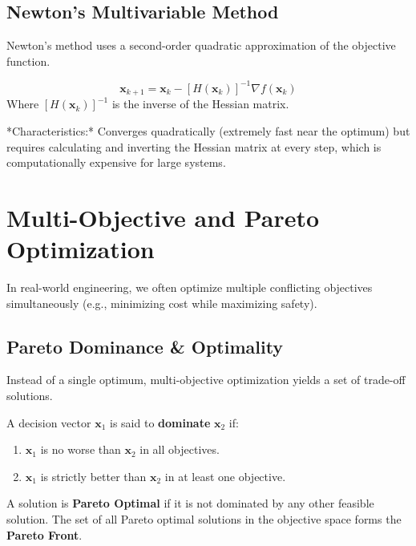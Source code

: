 \documentclass[12pt,a4paper]{article}
\begin{document}
\subsection{Newton's Multivariable Method}
Newton's method uses a second-order quadratic approximation of the objective function.

\begin{tcolorbox}[formulabox, title={Newton's Multivariable Update}]
\begin{equation}
  \mathbf{x}_{k+1} = \mathbf{x}_k - [H(\mathbf{x}_k)]^{-1} \nabla f(\mathbf{x}_k)
\end{equation}
Where $[H(\mathbf{x}_k)]^{-1}$ is the inverse of the Hessian matrix.
\par\vspace{3pt}
*Characteristics:* Converges quadratically (extremely fast near the optimum) but requires calculating and inverting the Hessian matrix at every step, which is computationally expensive for large systems.
\end{tcolorbox}

\section{Multi-Objective and Pareto Optimization}

In real-world engineering, we often optimize multiple conflicting objectives simultaneously (e.g., minimizing cost while maximizing safety).

\subsection{Pareto Dominance \& Optimality}
Instead of a single optimum, multi-objective optimization yields a set of trade-off solutions.

\begin{tcolorbox}[defbox, title={Definition of Pareto Dominance}]
A decision vector $\mathbf{x}_1$ is said to \textbf{dominate} $\mathbf{x}_2$ if:
\begin{enumerate}[label=\textbf{\arabic*.}, leftmargin=*, itemsep=2pt, topsep=0pt]
  \item $\mathbf{x}_1$ is no worse than $\mathbf{x}_2$ in all objectives.
  \item $\mathbf{x}_1$ is strictly better than $\mathbf{x}_2$ in at least one objective.
\end{enumerate}
A solution is \textbf{Pareto Optimal} if it is not dominated by any other feasible solution. The set of all Pareto optimal solutions in the objective space forms the \textbf{Pareto Front}.
\end{tcolorbox}
\end{document}
